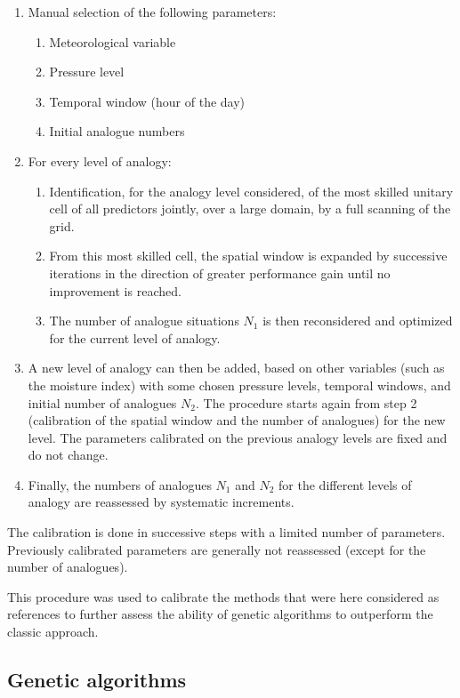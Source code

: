 \documentclass[review]{elsarticle}
\begin{document}
\begin{enumerate}
	\item Manual selection of the following parameters:
	\begin{enumerate}
		\item Meteorological variable
		\item Pressure level
		\item Temporal window (hour of the day)
		\item Initial analogue numbers
	\end{enumerate}
	
	\item For every level of analogy:
	\begin{enumerate}
		\item Identification, for the analogy level considered, of the most skilled unitary cell of all predictors jointly, over a large domain, by a full scanning of the grid.
		\item From this most skilled cell, the spatial window is expanded by successive iterations in the direction of greater performance gain until no improvement is reached.
		\item The number of analogue situations $N_{1}$ is then reconsidered and optimized for the current level of analogy.
	\end{enumerate}
	\item A new level of analogy can then be added, based on other variables (such as the moisture index) with some chosen pressure levels, temporal windows, and initial number of analogues $N_{2}$. The procedure starts again from step 2 (calibration of the spatial window and the number of analogues) for the new level. The parameters calibrated on the previous analogy levels are fixed and do not change. 
	\item Finally, the numbers of analogues $N_{1}$ and $N_{2}$ for the different levels of analogy are reassessed by systematic increments.
\end{enumerate}

The calibration is done in successive steps with a limited number of parameters. Previously calibrated parameters are generally not reassessed (except for the number of analogues).

This procedure was used to calibrate the methods that were here considered as references to further assess the ability of genetic algorithms to outperform the classic approach.


\subsection{Genetic algorithms}
\label{sec:gas}
\end{document}
